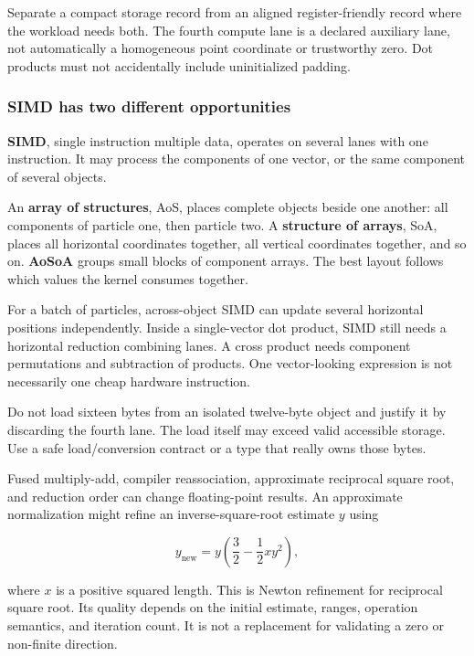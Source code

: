 Separate a compact storage record from an aligned register-friendly record where the workload needs both. The fourth compute lane is a declared auxiliary lane, not automatically a homogeneous point coordinate or trustworthy zero. Dot products must not accidentally include uninitialized padding.

\subsubsection{SIMD has two different opportunities}\label{02-foundations-ii-ch037-simd-has-two-different-opportunities}

\textbf{SIMD}, single instruction multiple data, operates on several lanes with one instruction. It may process the components of one vector, or the same component of several objects.

An \textbf{array of structures}, AoS, places complete objects beside one another: all components of particle one, then particle two. A \textbf{structure of arrays}, SoA, places all horizontal coordinates together, all vertical coordinates together, and so on. \textbf{AoSoA} groups small blocks of component arrays. The best layout follows which values the kernel consumes together.

For a batch of particles, across-object SIMD can update several horizontal positions independently. Inside a single-vector dot product, SIMD still needs a horizontal reduction combining lanes. A cross product needs component permutations and subtraction of products. One vector-looking expression is not necessarily one cheap hardware instruction.

Do not load sixteen bytes from an isolated twelve-byte object and justify it by discarding the fourth lane. The load itself may exceed valid accessible storage. Use a safe load/conversion contract or a type that really owns those bytes.

Fused multiply-add, compiler reassociation, approximate reciprocal square root, and reduction order can change floating-point results. An approximate normalization might refine an inverse-square-root estimate \(y\) using

\[
y_{\mathrm{new}}=y\left(\frac32-\frac12xy^2\right),
\]

where \(x\) is a positive squared length. This is Newton refinement for reciprocal square root. Its quality depends on the initial estimate, ranges, operation semantics, and iteration count. It is not a replacement for validating a zero or non-finite direction.

